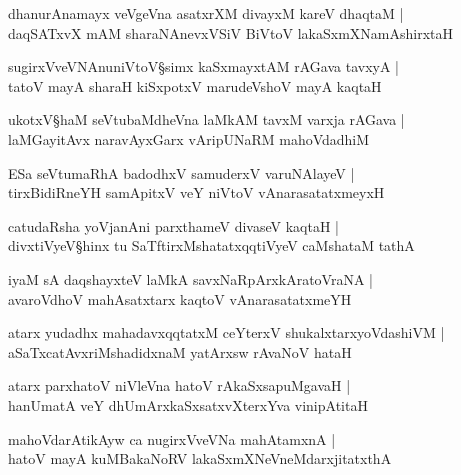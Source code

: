 \begin{shloka}
dhanurAnamayx veVgeVna asatxrXM divayxM kareV dhaqtaM |\\
daqSATxvX mAM sharaNAnevxVSiV BiVtoV lakaSxmXNamAshirxtaH 
\end{shloka}

\begin{shloka}
sugirxVveVNAnuniVtoV\S simx kaSxmayxtAM rAGava tavxyA |\\
tatoV mayA sharaH kiSxpotxV marudeVshoV mayA kaqtaH 
\end{shloka}

\begin{shloka}
ukotxV\S haM seVtubaMdheVna laMkAM tavxM varxja rAGava |\\
laMGayitAvx naravAyxGarx vAripUNaRM mahoVdadhiM 
\end{shloka}

\begin{shloka}
ESa seVtumaRhA\R{} badodhxV samuderxV  varuNAlayeV |\\
tirxBidiRneYH samApitxV veY niVtoV vAnarasatatxmeyxH
\end{shloka}

\begin{shloka}
catudaRsha yoVjanAni parxthameV divaseV kaqtaH |\\
divxtiVyeV\S hinx tu SaTftirxMshatatxqqtiVyeV caMshataM tathA
\end{shloka}

\begin{shloka}
iyaM sA daqshayxteV laMkA savxNaRpArxkAratoVraNA |\\
avaroVdhoV mahAsatxtarx kaqtoV vAnarasatatxmeYH 
\end{shloka}

\begin{shloka}
atarx yudadhx mahadavxqqtatxM ceYterxV shukalxtarxyoVdashiVM |\\
aSaTxcatAvxriMshadidxnaM yatArxsw rAvaNoV hataH
\end{shloka}

\begin{shloka}
atarx parxhatoV niVleVna hatoV rAkaSxsapuMgavaH |\\
hanUmatA veY dhUmArxkaSxsatxvXterxYva vinipAtitaH 
\end{shloka}

\begin{shloka}
mahoVdarAtikAyw ca nugirxVveVNa mahAtamxnA |\\
hatoV mayA kuMBakaNoRV lakaSxmXNeVneMdarxjitatxthA 
\end{shloka}

